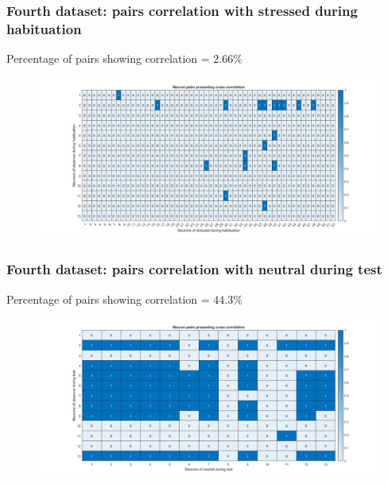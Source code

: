 \documentclass{beamer}
\begin{document}
\begin{frame}
\frametitle{Fourth dataset: pairs correlation with stressed during habituation}

Percentage of pairs showing correlation = $ 2.66\%$

\begin{figure}[H]
\begin{center}
	\hspace*{-1cm}
	\includegraphics[scale=.28]{neuron_corr_stress_hab4.jpg} 
\end{center}  


\end{figure}

\end{frame}

\begin{frame}
\frametitle{Fourth dataset: pairs correlation with neutral during test}

Percentage of pairs showing correlation = $ 44.3\%$

\begin{figure}[H]
\begin{center}
\hspace*{-1cm}
\includegraphics[scale=.28]{neuron_corr_neut_test4.jpg} 
\end{center}  


\end{figure}

\end{frame}
\end{document}
